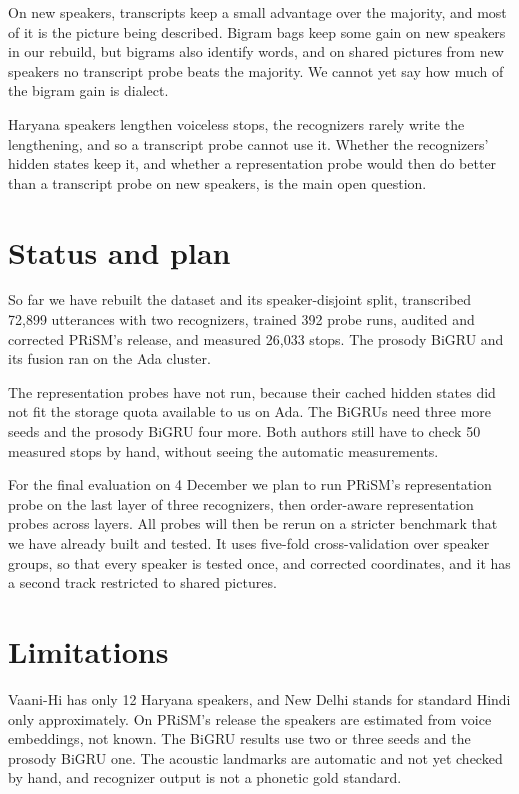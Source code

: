 \documentclass[11pt]{article}
\begin{document}
On new speakers, transcripts keep a small advantage over the majority, and most of it is the picture being
described. Bigram bags keep some gain on new speakers in our rebuild, but bigrams also identify words, and on
shared pictures from new speakers no transcript probe beats the majority. We cannot yet say how much of the bigram gain is dialect.

Haryana speakers lengthen voiceless stops,
the recognizers rarely write the lengthening, and so a transcript probe cannot use it. Whether the recognizers'
hidden states keep it, and whether a representation probe would then do better than a transcript probe on new
speakers, is the main open question.

\section{Status and plan}
\label{sec:plan}
So far we have rebuilt the dataset and its speaker-disjoint split, transcribed 72,899 utterances with two
recognizers, trained 392 probe runs, audited and corrected PRiSM's release, and measured 26,033 stops. The prosody
BiGRU and its fusion ran on the Ada cluster.

The representation probes have not run, because their cached hidden states did not fit the storage quota
available to us on Ada. The BiGRUs need three more seeds and the prosody BiGRU four more. Both authors still have
to check 50 measured stops by hand, without seeing the automatic measurements.

For the final evaluation on 4 December we plan to run PRiSM's representation probe on the last layer of three
recognizers, then order-aware representation probes across layers. All probes will then be rerun on a stricter
benchmark that we have already built and tested. It uses five-fold cross-validation over speaker groups, so that
every speaker is tested once, and corrected coordinates, and it has a second track restricted to shared pictures.

\section*{Limitations}
Vaani-Hi has only 12 Haryana speakers, and New Delhi stands for standard Hindi only approximately. On PRiSM's
release the speakers are estimated from voice embeddings, not known. The BiGRU results use two or three seeds and
the prosody BiGRU one. The acoustic landmarks are automatic and not yet checked by hand, and recognizer output is
not a phonetic gold standard.
\end{document}
